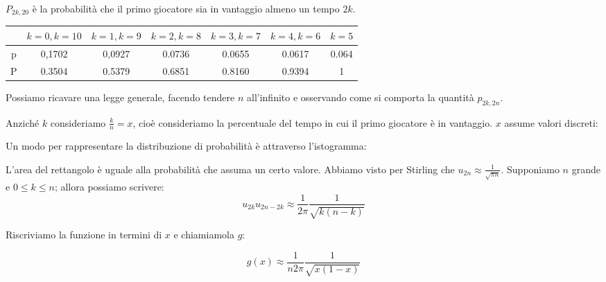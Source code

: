 \documentclass[a4paper,12pt]{book}
\begin{document}
$ P_{2k,20} $ è la probabilità che il primo giocatore sia in vantaggio almeno un tempo $ 2k $.

\begin{center}
	\begin{tabular}{ c|c|c|c|c|c|c }	

		 & $ k= 0, k = 10 $ & $ k=1, k=9 $ & $ k=2, k=8 $ & $ k=3, k=7 $ & $ k=4, k=6 $ & $ k=5 $ \\
		\hline
		
		p & 0,1702 & 0,0927 & 0.0736 & 0.0655 & 0.0617 & 0.064 \\
		P & 0.3504 & 0.5379 & 0.6851 & 0.8160 & 0.9394 & 1 
		
	\end{tabular}
\end{center}

Possiamo ricavare una legge generale, facendo tendere $ n $ all'infinito e osservando come si comporta la quantità $ p_{2k, 2n} $.

Anziché $ k $ consideriamo $ \frac{k}{n} = x $, cioè consideriamo la percentuale del tempo in cui il primo giocatore è in vantaggio. $ x $ assume valori discreti:


Un modo per rappresentare la distribuzione di probabilità è attraverso l'istogramma:

\begin{multicols}{2}
	
	
	L'area del rettangolo è uguale alla probabilità che assuma un certo valore. 
	Abbiamo visto per Stirling che $ u_{2n} \approx \frac{1}{\sqrt{\pi n}} $. 
	Supponiamo $ n $ grande e $ 0 \le k \le n $; allora possiamo scrivere:
		$$ u_{2k} u_{2n-2k} \approx \frac{1}{2\pi}\frac{1}{\sqrt{k(n-k)}} $$
	
\end{multicols}

Riscriviamo la funzione in termini di $ x $ e chiamiamola $ g $:

$$ g(x) \approx \frac{1}{n2\pi} \frac{1}{\sqrt{x(1-x)}} $$
\end{document}
